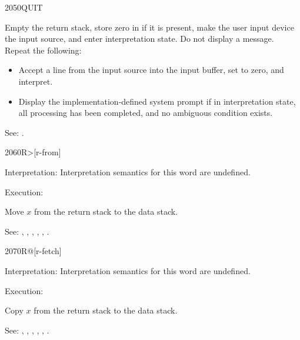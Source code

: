 \begin{newword}{2050}{QUIT}
	\stack{}{}

	Empty the return stack, store zero in  if it is
	present, make the user input device the input source, and enter
	interpretation state. Do not display a message. Repeat the
	following:
	\begin{itemize}
	\item Accept a line from the input source into the input buffer,
		set  to zero, and interpret.
	\item Display the implementation-defined system prompt if in
		interpretation state, all processing has been completed,
		and no ambiguous condition exists.
	\end{itemize}

\item[See:]
	.
\end{newword}


\begin{newword*}[Rfrom]{2060}{R>}[r-from]
\item[Interpretation:]
	Interpretation semantics for this word are undefined.

\item[Execution:]

	Move $x$ from the return stack to the data stack.

\item[See:]
	,
	,
	,
	,
	,
	.
\end{newword*}


\begin{newword*}{2070}{R@}[r-fetch]
\item[Interpretation:]
	Interpretation semantics for this word are undefined.

\item[Execution:]

	Copy $x$ from the return stack to the data stack.

\item[See:]
	,
	,
	,
	,
	,
	.
\end{newword*}


